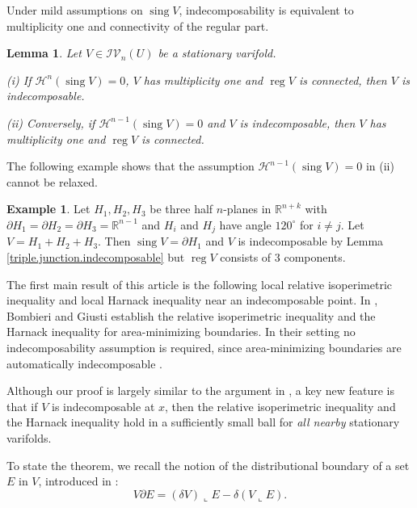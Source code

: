 \documentclass[11pt]{amsart}
\newtheorem{lemma}[theorem]{Lemma}
\theoremstyle{definition}
\newtheorem{example}[theorem]{Example}
\newcommand{\HH}{\mathcal{H}}
\newcommand{\R}{\mathbb{R}}
\newcommand{\IV}{\mathcal{IV}}
\DeclareMathOperator{\sing}{sing}
\DeclareMathOperator{\reg}{reg}
\begin{document}
Under mild assumptions on $\sing V$, indecomposability is equivalent to multiplicity one and connectivity of the regular part.

\begin{lemma}   
Let $V \in \IV_n(U)$ be a stationary varifold.  

(i) If $\mathcal{H}^n(\sing V) = 0$, $V$ has multiplicity one and $\reg V$ is connected, then $V$ is indecomposable.  

(ii) Conversely, if $\mathcal{H}^{n-1}(\sing V) = 0$ and $V$ is indecomposable, then $V$ has multiplicity one and $\reg V$ is connected.

\end{lemma}
The following example shows that the assumption $\HH^{n-1}(\sing V)=0$ in (ii) cannot be relaxed.

\begin{example}\label{triple.junction.intro}
    Let $H_1,H_2,H_3$ be three half $n$-planes in $\R^{n+k}$ with $\partial H_1=\partial H_2=\partial H_3=\R^{n-1}$ and $H_i$ and $H_j$ have angle $120^\circ$ for $i\neq j$. Let $V=H_1+H_2+H_3$. Then $\sing V=\partial H_1$ and $V$ is indecomposable by Lemma \ref{triple.junction.indecomposable} but $\reg V$ consists of 3 components.
\end{example}

The first main result of this article is the following local relative isoperimetric inequality and local Harnack inequality near an indecomposable point. In \cite[Theorem~2, Theorem~5]{bombieri1972harnack}, Bombieri and Giusti establish the relative isoperimetric inequality and the Harnack inequality for area-minimizing boundaries. In their setting no indecomposability assumption is required, since area-minimizing boundaries are automatically indecomposable \cite[Theorem~1]{bombieri1972harnack}. 

Although our proof is largely similar to the argument in \cite{bombieri1972harnack}, a key new feature is that if $V$ is indecomposable at $x$, then the relative isoperimetric inequality and the Harnack inequality hold in a sufficiently small ball for \emph{all nearby} stationary varifolds.

To state the theorem, we recall the notion of the distributional boundary of a set $E$ in $V$, introduced in \cite[Definition~5.1]{Me2weaklydifferentiable}:
\[
V\partial E=(\delta V)\llcorner E-\delta (V\llcorner E).
\]
\end{document}
